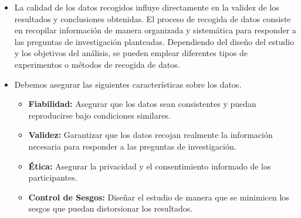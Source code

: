 \documentclass[
  letterpaper,
  DIV=11,
  numbers=noendperiod]{scrreprt}
\providecommand{\tightlist}{%
  \setlength{\itemsep}{0pt}\setlength{\parskip}{0pt}}
\begin{document}
\begin{itemize}
\tightlist
\item
  La calidad de los datos recogidos influye directamente en la validez
  de los resultados y conclusiones obtenidas. El proceso de recogida de
  datos consiste en recopilar información de manera organizada y
  sistemática para responder a las preguntas de investigación
  planteadas. Dependiendo del diseño del estudio y los objetivos del
  análisis, se pueden emplear diferentes tipos de experimentos o métodos
  de recogida de datos.
\item
  Debemos asegurar las siguientes características sobre los datos.

  \begin{itemize}
  \tightlist
  \item
    \textbf{Fiabilidad:} Asegurar que los datos sean consistentes y
    puedan reproducirse bajo condiciones similares.
  \item
    \textbf{Validez:} Garantizar que los datos recojan realmente la
    información necesaria para responder a las preguntas de
    investigación.
  \item
    \textbf{Ética:} Asegurar la privacidad y el consentimiento informado
    de los participantes.
  \item
    \textbf{Control de Sesgos:} Diseñar el estudio de manera que se
    minimicen los sesgos que puedan distorsionar los resultados.
  \end{itemize}
\end{itemize}
\end{document}
